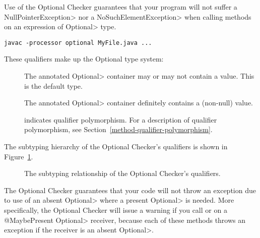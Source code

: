 Use of the Optional Checker guarantees that your program will not suffer a
\<NullPointerException> nor a \<NoSuchElementException> when calling
methods on an expression of \<Optional> type.



\begin{Verbatim}
javac -processor optional MyFile.java ...
\end{Verbatim}



These qualifiers make up the Optional type system:

\begin{description}

\item[]
  The annotated \<Optional> container may or may not contain a value.
  This is the default type.

\item[]
  The annotated \<Optional> container definitely contains a (non-null) value.

\item[]
  indicates qualifier polymorphism.
  For a description of qualifier polymorphism, see
  Section~\ref{method-qualifier-polymorphism}.

\end{description}

The subtyping hierarchy of the Optional Checker's qualifiers is shown in
Figure~\ref{fig-optional-hierarchy}.

\begin{figure}
\caption{The subtyping relationship of the Optional Checker's qualifiers.}
\label{fig-optional-hierarchy}
\end{figure}



The Optional Checker guarantees that your code will not throw an exception
due to use of an absent \<Optional> where a present \<Optional> is needed.
More specifically, the Optional Checker will issue a warning if you call
or
on a \<@MaybePresent Optional> receiver, because each of these methods
throws an exception if the receiver is an absent
\<Optional>.

